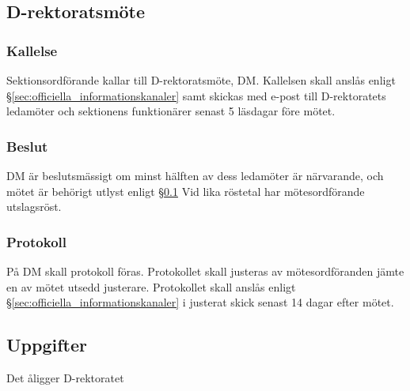 \documentclass{dgovdoc}
\begin{document}
\subsection{D-rektoratsmöte}
\label{sec:d_rektoratsmote}

\subsubsection{Kallelse}

Sektionsordförande kallar till D-rektoratsmöte, DM. Kallelsen skall anslås
enligt \S\ref{sec:officiella_informationskanaler} samt skickas med e-post till
D-rektoratets ledamöter och sektionens funktionärer senast 5 läsdagar före
mötet.

\subsubsection{Beslut}

DM är beslutsmässigt om minst hälften av dess ledamöter är närvarande, och
mötet är behörigt utlyst enligt \S\ref{sec:d_rektoratsmote} Vid lika röstetal har
mötesordförande utslagsröst.

\subsubsection{Protokoll}

På DM skall protokoll föras. Protokollet skall justeras av mötesordföranden
jämte en av mötet utsedd justerare. Protokollet skall anslås enligt
\S\ref{sec:officiella_informationskanaler} i justerat skick senast 14 dagar efter
mötet.

\subsection{Uppgifter}

Det åligger D-rektoratet
\end{document}
